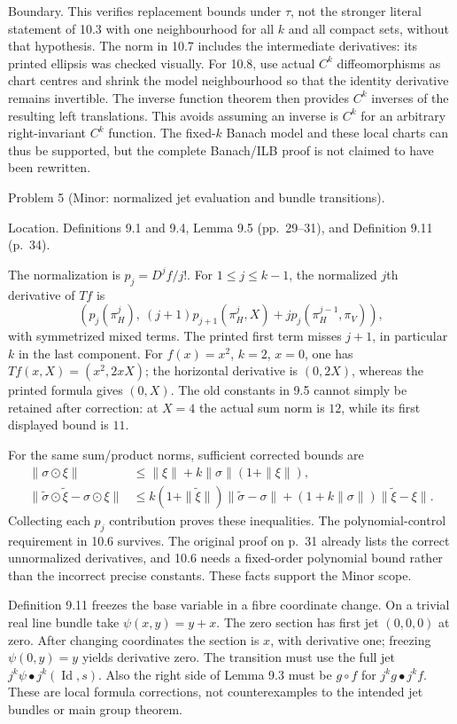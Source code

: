 \documentclass[10pt]{article}
\begin{document}
Boundary. This verifies replacement bounds under \(\tau\), not the stronger literal statement of 10.3 with one neighbourhood for all \(k\) and all compact sets, without that hypothesis. The norm in 10.7 includes the intermediate derivatives: its printed ellipsis was checked visually. For 10.8, use actual \(C^k\) diffeomorphisms as chart centres and shrink the model neighbourhood so that the identity derivative remains invertible. The inverse function theorem then provides \(C^k\) inverses of the resulting left translations. This avoids assuming an inverse is \(C^k\) for an arbitrary right-invariant \(C^k\) function. The fixed-\(k\) Banach model and these local charts can thus be supported, but the complete Banach/ILB proof is not claimed to have been rewritten.\par
Problem 5 (Minor: normalized jet evaluation and bundle transitions).\par
Location. Definitions 9.1 and 9.4, Lemma 9.5 (pp. 29–31), and Definition 9.11 (p. 34).\par
The normalization is \(p_j=D^jf/j!\). For \(1\le j\le k-1\), the normalized \(j\)th derivative of \(Tf\) is \[\left(p_j(\pi_H^j),\
 (j+1)p_{j+1}(\pi_H^j,X)
 +j p_j(\pi_H^{j-1},\pi_V)\right),\] with symmetrized mixed terms. The printed first term misses \(j+1\), in particular \(k\) in the last component. For \(f(x)=x^2\), \(k=2\), \(x=0\), one has \(Tf(x,X)=(x^2,2xX)\); the horizontal derivative is \((0,2X)\), whereas the printed formula gives \((0,X)\). The old constants in 9.5 cannot simply be retained after correction: at \(X=4\) the actual sum norm is \(12\), while its first displayed bound is \(11\).\par
For the same sum/product norms, sufficient corrected bounds are \[\begin{aligned}
 \|\sigma\odot\xi\|&\le
 \|\xi\|+k\|\sigma\|(1+\|\xi\|),\\
 \|\widetilde\sigma\odot\widetilde\xi-\sigma\odot\xi\|
 &\le k(1+\|\widetilde\xi\|)\|\widetilde\sigma-\sigma\|
 +(1+k\|\sigma\|)\|\widetilde\xi-\xi\|.\end{aligned}\] Collecting each \(p_j\) contribution proves these inequalities. The polynomial-control requirement in 10.6 survives. The original proof on p. 31 already lists the correct unnormalized derivatives, and 10.6 needs a fixed-order polynomial bound rather than the incorrect precise constants. These facts support the Minor scope.\par
Definition 9.11 freezes the base variable in a fibre coordinate change. On a trivial real line bundle take \(\psi(x,y)=y+x\). The zero section has first jet \((0,0,0)\) at zero. After changing coordinates the section is \(x\), with derivative one; freezing \(\psi(0,y)=y\) yields derivative zero. The transition must use the full jet \(j^k\psi\bullet j^k(\operatorname{Id},s)\). Also the right side of Lemma 9.3 must be \(g\circ f\) for \(j^kg\bullet j^kf\). These are local formula corrections, not counterexamples to the intended jet bundles or main group theorem.\par
\end{document}
